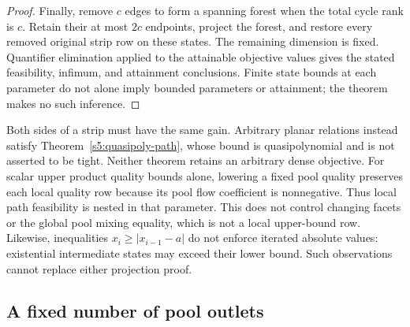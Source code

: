 \begin{proof}
Finally, remove $c$ edges to form a spanning forest when the total cycle
rank is $c$. Retain their at most $2c$ endpoints, project the forest,
and restore every removed original strip row on these states. The
remaining dimension is fixed. Quantifier elimination applied to the
attainable objective values gives the stated feasibility, infimum, and
attainment conclusions. Finite state bounds at each parameter do not
alone imply bounded parameters or attainment; the theorem makes no such
inference.
\end{proof}

Both sides of a strip must have the same gain. Arbitrary planar
relations instead satisfy Theorem~\ref{s5:quasipoly-path}, whose bound
is quasipolynomial and is not asserted to be tight. Neither theorem
retains an arbitrary dense objective. For scalar upper product quality
bounds alone, lowering a fixed pool quality preserves each local
quality row because its pool flow coefficient is nonnegative. Thus
local path feasibility is nested in that parameter. This does not
control changing facets or the global pool mixing equality, which is
not a local upper-bound row. Likewise, inequalities
$x_i\ge|x_{i-1}-a|$ do not enforce iterated absolute values: existential
intermediate states may exceed their lower bound. Such observations
cannot replace either projection proof.

\subsection{A fixed number of pool outlets}\label{s5:fixed-outlets}

